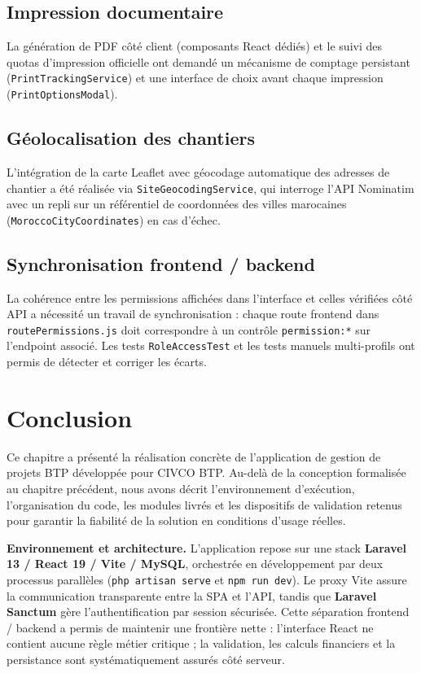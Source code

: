 \subsection{Impression documentaire}

La génération de PDF côté client (composants React dédiés) et le suivi des quotas
d'impression officielle ont demandé un mécanisme de comptage persistant
(\texttt{PrintTrackingService}) et une interface de choix avant chaque impression
(\texttt{PrintOptionsModal}).

\subsection{Géolocalisation des chantiers}

L'intégration de la carte Leaflet avec géocodage automatique des adresses de chantier
a été réalisée via \texttt{SiteGeocodingService}, qui interroge l'API Nominatim avec
un repli sur un référentiel de coordonnées des villes marocaines
(\texttt{MoroccoCityCoordinates}) en cas d'échec.

\subsection{Synchronisation frontend / backend}

La cohérence entre les permissions affichées dans l'interface et celles vérifiées
côté API a nécessité un travail de synchronisation : chaque route frontend dans
\texttt{routePermissions.js} doit correspondre à un contrôle \texttt{permission:*}
sur l'endpoint associé. Les tests \texttt{RoleAccessTest} et les tests manuels
multi-profils ont permis de détecter et corriger les écarts.

\section*{Conclusion}

Ce chapitre a présenté la réalisation concrète de l'application de gestion de
projets BTP développée pour CIVCO BTP. Au-delà de la conception formalisée au
chapitre précédent, nous avons décrit l'environnement d'exécution, l'organisation
du code, les modules livrés et les dispositifs de validation retenus pour garantir
la fiabilité de la solution en conditions d'usage réelles.

\medskip

\textbf{Environnement et architecture.} L'application repose sur une stack
\textbf{Laravel 13 / React 19 / Vite / MySQL}, orchestrée en développement par
deux processus parallèles (\texttt{php artisan serve} et \texttt{npm run dev}).
Le proxy Vite assure la communication transparente entre la SPA et l'API, tandis
que \textbf{Laravel Sanctum} gère l'authentification par session sécurisée.
Cette séparation frontend / backend a permis de maintenir une frontière nette :
l'interface React ne contient aucune règle métier critique ; la validation, les
calculs financiers et la persistance sont systématiquement assurés côté serveur.

